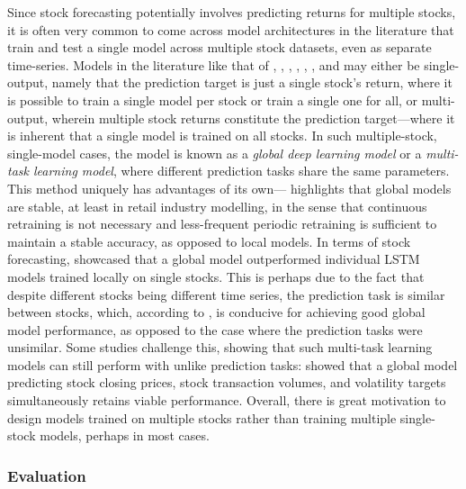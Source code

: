 \documentclass[stu,floatsintext]{apa7}
\begin{document}
Since stock forecasting potentially involves predicting returns for multiple stocks, it is often very common to come across model architectures in the literature that train and test a single model across multiple stock datasets, even as separate time-series. Models in the literature like that of \textcite{chen2026newsdriven}, \textcite{yao2018highfrequency}, \textcite{fataliyev2023mcasp}, \textcite{bustarviejo2026multimodal}, \textcite{mandal2023enhancing}, \textcite{xu2025hrformer}, and \textcite{gu2024predicting} may either be single-output, namely that the prediction target is just a single stock's return, where it is possible to train a single model per stock or train a single one for all, or multi-output, wherein multiple stock returns constitute the prediction target—where it is inherent that a single model is trained on all stocks. In such multiple-stock, single-model cases, the model is known as a \textit{global deep learning model} or a \textit{multi-task learning model}, where different prediction tasks share the same parameters. This method uniquely has advantages of its own—\textcite{zanotti2025do} highlights that global models are stable, at least in retail industry modelling, in the sense that continuous retraining is not necessary and less-frequent periodic retraining is sufficient to maintain a stable accuracy, as opposed to local models. In terms of stock forecasting, \textcite{guennioui2024global} showcased that a global model outperformed individual LSTM models trained locally on single stocks. This is perhaps due to the fact that despite different stocks being different time series, the prediction task is similar between stocks, which, according to \textcite{zhangy2017overview}, is conducive for achieving good global model performance, as opposed to the case where the prediction tasks were unsimilar. Some studies challenge this, showing that such multi-task learning models can still perform with unlike prediction tasks: \textcite{jiang2025multitask} showed that a global model predicting stock closing prices, stock transaction volumes, and volatility targets simultaneously retains viable performance. Overall, there is great motivation to design models trained on multiple stocks rather than training multiple single-stock models, perhaps in most cases.

\subsubsection{Evaluation}
\end{document}
